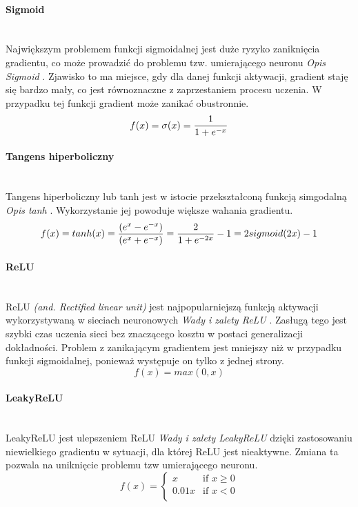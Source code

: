 \paragraph{Sigmoid} \mbox{}\\
Największym problemem funkcji sigmoidalnej jest duże ryzyko zaniknięcia gradientu,
co może prowadzić do problemu tzw. umierającego neuronu \textit{Opis Sigmoid} \cite{activationFunctions}.
Zjawisko to ma miejsce, gdy dla danej funkcji aktywacji, gradient staję się bardzo mały, co jest równoznaczne
z zaprzestaniem procesu uczenia. W przypadku tej funkcji gradient może zanikać obustronnie.
\begin{equation}
f(x) = \sigma(x) = \frac{1}{1 + e^{-x}} \\
\end{equation}

\paragraph{Tangens hiperboliczny} \mbox{}\\
Tangens hiperboliczny lub tanh jest w istocie przekształconą funkcją simgodalną
\textit{Opis tanh} \cite{activationFunctions, activationFunctionsV2}. Wykorzystanie
jej powoduje większe wahania gradientu.
\begin{equation}
f(x) = tanh(x) = \frac{(e^x - e^{-x})}{(e^x + e^{-x})} = \frac{2}{1+e^{-2x}} - 1 = 2 sigmoid(2x) - 1\\
\end{equation}

\paragraph{ReLU} \mbox{}\\
ReLU \textit{(and. Rectified linear unit)} jest najpopularniejszą funkcją aktywacji
wykorzystywaną w sieciach neuronowych \textit{Wady i zalety ReLU} \cite{CS231n_activ, WIKIrectifier}.
Zasługą tego jest szybki czas uczenia sieci
bez znaczącego kosztu w postaci generalizacji dokładności. Problem z zanikającym
gradientem jest mniejszy niż w przypadku funkcji sigmoidalnej, ponieważ występuje
on tylko z jednej strony.
\begin{equation}
f(x) = max(0, x)
\end{equation}

\paragraph{LeakyReLU} \mbox{}\\
LeakyReLU jest ulepszeniem ReLU \textit{Wady i zalety LeakyReLU} \cite{CS231n_activ}
dzięki zastosowaniu niewielkiego gradientu w sytuacji, dla której ReLU jest nieaktywne. Zmiana ta pozwala na uniknięcie problemu tzw
umierającego neuronu.
\begin{equation}
f(x) =
\begin{cases}
x & \text{if } x \geqslant 0 \\
0.01x & \text{if } x < 0 \\
\end{cases}
\end{equation}

